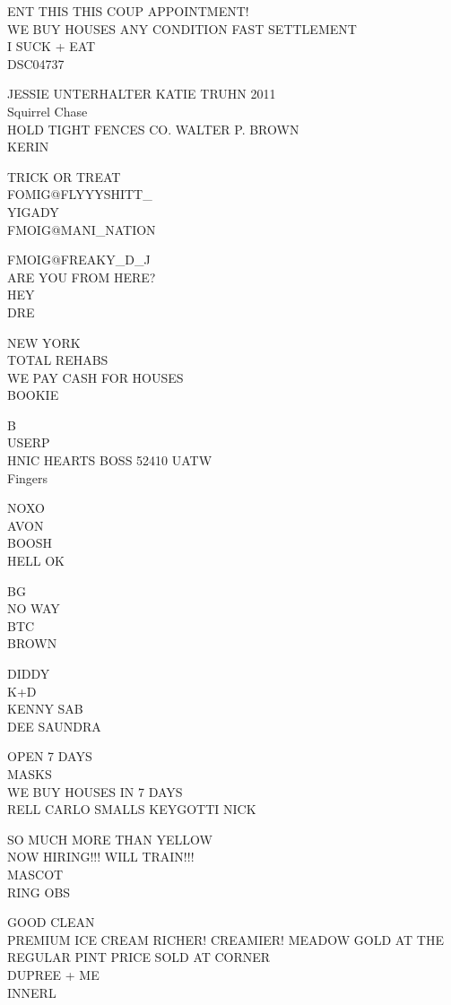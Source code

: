 \documentclass[10pt,letterpaper]{article}
\begin{document}
ENT THIS THIS COUP APPOINTMENT!\\
WE BUY HOUSES ANY CONDITION FAST SETTLEMENT\\
I SUCK + EAT\\
DSC04737

JESSIE UNTERHALTER KATIE TRUHN 2011\\
Squirrel Chase\\
HOLD TIGHT FENCES CO. WALTER P. BROWN\\
KERIN

TRICK OR TREAT\\
FOMIG@FLYYYSHITT\_\\
YIGADY\\
FMOIG@MANI\_NATION

FMOIG@FREAKY\_D\_J\\
ARE YOU FROM HERE?\\
HEY\\
DRE

NEW YORK\\
TOTAL REHABS\\
WE PAY CASH FOR HOUSES\\
BOOKIE

B\\
USERP\\
HNIC HEARTS BOSS 52410 UATW\\
Fingers

NOXO\\
AVON\\
BOOSH\\
HELL OK

BG\\
NO WAY\\
BTC\\
BROWN

DIDDY\\
K+D\\
KENNY SAB\\
DEE SAUNDRA

OPEN 7 DAYS\\
MASKS\\
WE BUY HOUSES IN 7 DAYS\\
RELL CARLO SMALLS KEYGOTTI NICK

SO MUCH MORE THAN YELLOW\\
NOW HIRING!!! WILL TRAIN!!!\\
MASCOT\\
RING OBS

GOOD CLEAN\\
PREMIUM ICE CREAM RICHER! CREAMIER! MEADOW GOLD AT THE REGULAR PINT PRICE SOLD AT CORNER\\
DUPREE + ME\\
INNERL
\end{document}
